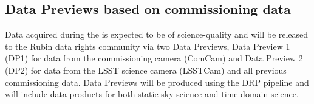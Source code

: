 \subsection{Data Previews based on commissioning data}

Data acquired during the \svs is expected to be of science-quality and will be released to the Rubin data rights community via two Data Previews, Data Preview 1 (DP1) for data from the commissioning camera (ComCam) and Data Preview 2 (DP2) for data from the LSST science camera (LSSTCam) and all previous commissioning data.
Data Previews will be produced using the DRP pipeline and will include data products for both static sky science and time domain science.
